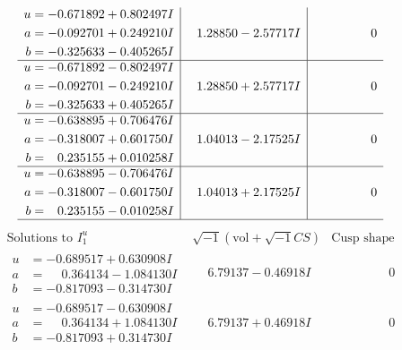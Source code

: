 \documentclass[1p]{elsarticle_modified}
\theoremstyle{definition}
\newcommand{\I}{\sqrt{-1}}
\begin{document}
$$\begin{array}{c|c|c}
\begin{aligned}
u &= -0.671892 + 0.802497 I \\
a &= -0.092701 + 0.249210 I \\
b &= -0.325633 - 0.405265 I\end{aligned}
 & \phantom{-}1.28850 - 2.57717 I & \phantom{-0.000000 } 0 \\ \hline\begin{aligned}
u &= -0.671892 - 0.802497 I \\
a &= -0.092701 - 0.249210 I \\
b &= -0.325633 + 0.405265 I\end{aligned}
 & \phantom{-}1.28850 + 2.57717 I & \phantom{-0.000000 } 0 \\ \hline\begin{aligned}
u &= -0.638895 + 0.706476 I \\
a &= -0.318007 + 0.601750 I \\
b &= \phantom{-}0.235155 + 0.010258 I\end{aligned}
 & \phantom{-}1.04013 - 2.17525 I & \phantom{-0.000000 } 0 \\ \hline\begin{aligned}
u &= -0.638895 - 0.706476 I \\
a &= -0.318007 - 0.601750 I \\
b &= \phantom{-}0.235155 - 0.010258 I\end{aligned}
 & \phantom{-}1.04013 + 2.17525 I & \phantom{-0.000000 } 0\\
 \hline 
 \end{array}$$\newpage$$\begin{array}{c|c|c}  
\text{Solutions to }I^u_{1}& \I (\text{vol} + \sqrt{-1}CS) & \text{Cusp shape}\\
 \hline 
\begin{aligned}
u &= -0.689517 + 0.630908 I \\
a &= \phantom{-}0.364134 - 1.084130 I \\
b &= -0.817093 - 0.314730 I\end{aligned}
 & \phantom{-}6.79137 - 0.46918 I & \phantom{-0.000000 } 0 \\ \hline\begin{aligned}
u &= -0.689517 - 0.630908 I \\
a &= \phantom{-}0.364134 + 1.084130 I \\
b &= -0.817093 + 0.314730 I\end{aligned}
 & \phantom{-}6.79137 + 0.46918 I & \phantom{-0.000000 } 0 \\ \hline\begin{aligned}

\end{aligned}
\end{array}$$
\end{document}
